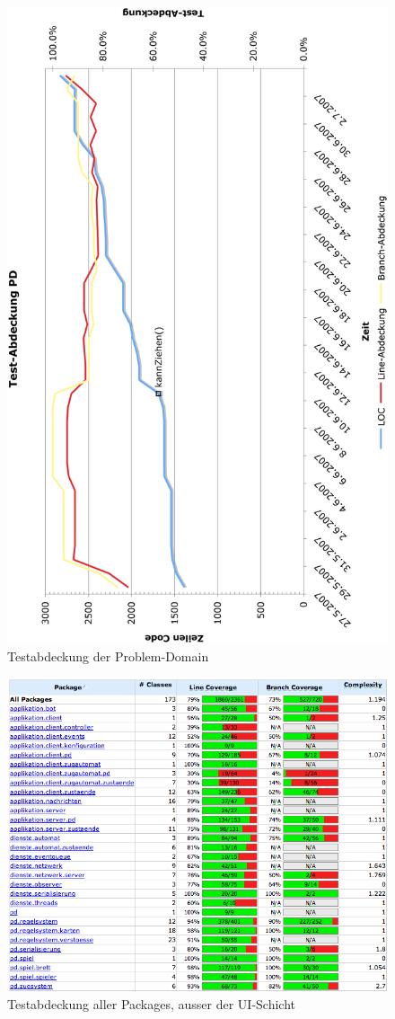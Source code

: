 \documentclass[12pt,halfparskip]{scrartcl}
\begin{document}
\begin{figure}[h]
	\centering
	\includegraphics[width=0.8 \textwidth]{test_abdeckung_pd}
	\caption{Testabdeckung der Problem-Domain}
	\label{fig:test_abdeckung_pd}
\end{figure}

\begin{figure}[h]
	\centering
	\includegraphics[width=0.8 \textwidth]{test_abdeckung_gesamt}
	\caption{Testabdeckung aller Packages, ausser der UI-Schicht}
	\label{fig:test_abdeckung_gesamt}
\end{figure}
\end{document}

